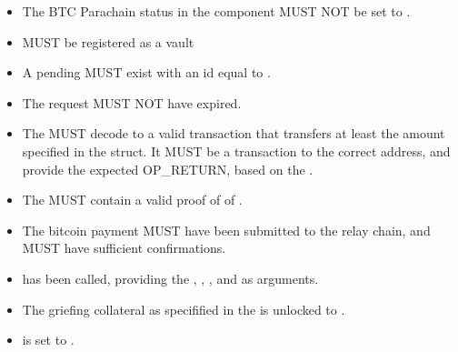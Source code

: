 \documentclass[a4paper,10pt,english]{sphinxmanual}
\begin{document}
\begin{itemize}
\item {} 
The BTC Parachain status in the {\hyperref[\detokenize{spec/security:security}]{}} component MUST NOT be set to .

\item {} 
 MUST be registered as a vault

\item {} 
A pending  MUST exist with an id equal to .

\item {} 
The request MUST NOT have expired.

\item {} 
The  MUST decode to a valid transaction that transfers at least the amount specified in the  struct. It MUST be a transaction to the correct address, and provide the expected OP\_RETURN, based on the .

\item {} 
The  MUST contain a valid proof of of .

\item {} 
The bitcoin payment MUST have been submitted to the relay chain, and MUST have sufficient confirmations.

\end{itemize}

\begin{itemize}
\item {} 
{\hyperref[\detokenize{spec/vault-registry:replacetokens}]{}} has been called, providing the , , , and  as arguments.

\item {} 
The griefing collateral as specifified in the  is unlocked to .

\item {} 
 is set to .

\end{itemize}
\end{document}
